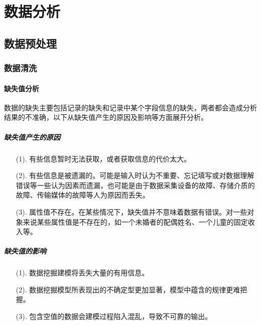 \documentclass[openany]{progbookcn}
\begin{document}
\part{数据分析}
\chapter{数据预处理}
\section{数据清洗}
\subsection{缺失值分析}
\indent 数据的缺失主要包括记录的缺失和记录中某个字段信息的缺失，两者都会造成分析结果的不准确，以下从缺失值产生的原因及影响等方面展开分析。
\subsubsection{缺失值产生的原因}
\begin{enumerate}
    \item [(1).]有些信息暂时无法获取，或者获取信息的代价太大。
    \item [(2).]有些信息是被遗漏的。可能是输入时认为不重要、忘记填写或对数据理解错误等一些认为因素而遗漏，也可能是由于数据采集设备的故障、存储介质的故障、传输媒体的故障等人为原因而丢失。
    \item [(3).]属性值不存在。在某些情况下，缺失值并不意味着数据有错误。对一些对象来说某些属性值是不存在的，如一个未婚者的配偶姓名、一个儿童的固定收入等。
\end{enumerate}
\subsubsection{缺失值的影响}
\begin{enumerate}
    \item [(1).]数据挖掘建模将丢失大量的有用信息。
    \item [(2).]数据挖掘模型所表现出的不确定型更加显著，模型中蕴含的规律更难把握。
    \item [(3).]包含空值的数据会建模过程陷入混乱，导致不可靠的输出。
\end{enumerate}
\end{document}

